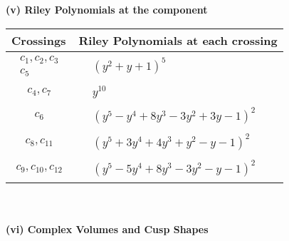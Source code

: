 \documentclass[1p]{elsarticle_modified}
\theoremstyle{definition}
\begin{document}
\newpage\renewcommand{\arraystretch}{1}
\flushleft \textbf{(v) Riley Polynomials at the component}\newline \\
\begin{tabular}{m{50pt}|m{274pt}}
Crossings & \hspace{64pt}Riley Polynomials at each crossing \\
\hline $$\begin{aligned}c_{1},c_{2},c_{3}\\c_{5}\end{aligned}$$&$\begin{aligned}
&(y^2+y+1)^5
\end{aligned}$\\
\hline $$\begin{aligned}c_{4},c_{7}\end{aligned}$$&$\begin{aligned}
&y^{10}
\end{aligned}$\\
\hline $$\begin{aligned}c_{6}\end{aligned}$$&$\begin{aligned}
&(y^5- y^4+8 y^3-3 y^2+3 y-1)^2
\end{aligned}$\\
\hline $$\begin{aligned}c_{8},c_{11}\end{aligned}$$&$\begin{aligned}
&(y^5+3 y^4+4 y^3+y^2- y-1)^2
\end{aligned}$\\
\hline $$\begin{aligned}c_{9},c_{10},c_{12}\end{aligned}$$&$\begin{aligned}
&(y^5-5 y^4+8 y^3-3 y^2- y-1)^2
\end{aligned}$\\
\hline
\end{tabular}\\~\\
\newpage\flushleft \textbf{(vi) Complex Volumes and Cusp Shapes}
\end{document}
